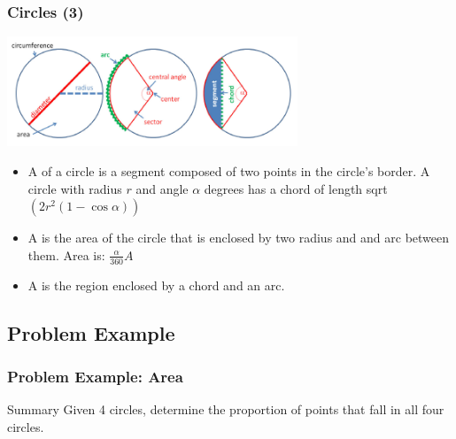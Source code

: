\documentclass{beamer}
\begin{document}
\begin{frame}
  \frametitle{Circles (3)}
  {\smaller
    \begin{center}
      \includegraphics[width=0.65\textwidth]{../img/circle_halim}
    \end{center}
  
  \begin{itemize}
  \item A  of a circle is a segment composed of two points in the circle's border. A circle with radius $r$ and angle $\alpha$ degrees has a chord of length sqrt$(2r^2(1-\cos{\alpha}))$
  \item A  is the area of the circle that is enclosed by two radius and and arc between them. Area is: $\frac{\alpha}{360}A$
  \item A  is the region enclosed by a chord and an arc.

  \end{itemize}
  }
\end{frame}


\subsection{Problem Example}
\begin{frame}
  \frametitle{Problem Example: Area}

  \begin{block}{Summary}
    Given 4 circles, determine the proportion of points that fall in all four circles.
  \end{block}
  
\end{frame}
\end{document}
